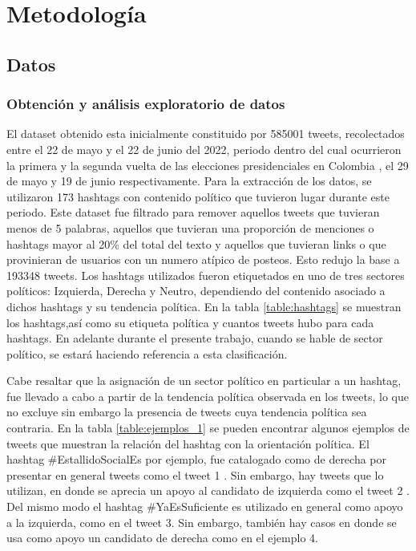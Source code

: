 \chapter{Metodología}

\section{Datos}

\subsection{Obtención y análisis exploratorio de datos}

El dataset obtenido esta inicialmente constituido por 585001 tweets, recolectados entre el 22 de mayo y el 22 de junio del 2022, periodo dentro del cual ocurrieron la primera y la segunda vuelta de las elecciones presidenciales en Colombia , el 29 de mayo y 19 de junio respectivamente. Para la extracción de los datos, se utilizaron 173 hashtags con contenido político que tuvieron lugar durante este periodo. Este dataset fue filtrado para remover aquellos tweets que tuvieran menos de 5 palabras, aquellos que tuvieran una proporción de menciones o hashtags mayor al 20\% del total del texto y aquellos que tuvieran links o que provinieran de usuarios con un numero atípico de posteos. Esto redujo la base a 193348 tweets.  Los hashtags utilizados fueron etiquetados en uno de tres sectores políticos: Izquierda, Derecha y Neutro, dependiendo del contenido asociado a dichos hashtags y su tendencia política. En la tabla \ref{table:hashtags} se muestran los hashtags,así como su etiqueta política y cuantos tweets hubo para cada hashtags. En adelante durante el presente trabajo, cuando se hable de sector político, se estará haciendo referencia a esta clasificación.

Cabe resaltar que la asignación de un sector político en particular a un hashtag, fue llevado a cabo a partir de la tendencia política observada en los tweets, lo que no excluye sin embargo la presencia de tweets cuya tendencia política sea contraria. En la tabla \ref{table:ejemplos_1} se pueden encontrar algunos ejemplos de tweets que muestran la relación del hashtag con la orientación política.  El hashtag \#EstallidoSocialEs por ejemplo, fue catalogado como de derecha por presentar en general tweets como el tweet 1 . Sin embargo, hay tweets que lo utilizan, en donde se aprecia un apoyo al candidato de izquierda como el tweet 2 . Del mismo modo el hashtag \#YaEsSuficiente es utilizado en general como apoyo a la izquierda, como en el tweet 3. Sin embargo, también hay casos en donde se usa como apoyo un candidato de derecha como en el ejemplo 4.

